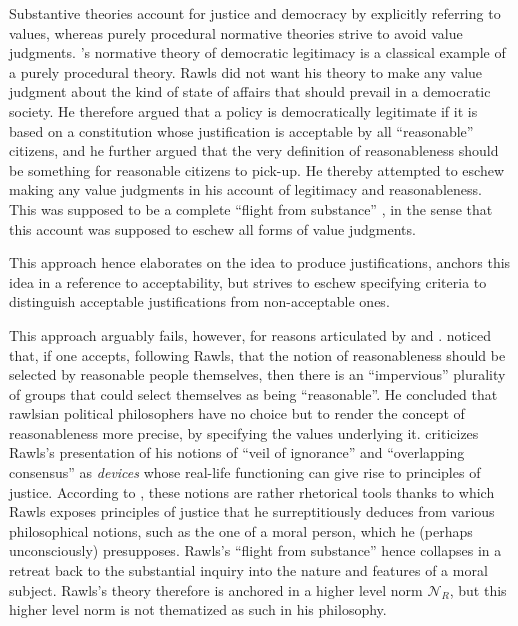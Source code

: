 \documentclass[preprint, french, english, 11pt, authoryear]{elsarticle}%
\begin{document}
Substantive theories account for justice and democracy by explicitly referring to values, whereas purely procedural normative theories strive to avoid value judgments. 
\cite{rawls_political_2005}’s normative theory of democratic legitimacy is a classical example of a purely procedural theory. 
Rawls did not want his theory to make any value judgment about the kind of state of affairs that should prevail in a democratic society. 
He therefore argued that a policy is democratically legitimate if it is based on a constitution whose justification is acceptable by all  “reasonable” citizens, and he further argued that the very definition of reasonableness should be something for reasonable citizens to pick-up. 
He thereby attempted to eschew making any value judgments in his account of legitimacy and reasonableness. 
This was supposed to be a complete ``flight from substance'' \citep{estlund_democratic_2009}, in the sense that this account was supposed to eschew all forms of value judgments.

This approach hence elaborates on the idea to produce justifications, anchors this idea in a reference to acceptability, but strives to eschew specifying criteria to distinguish acceptable justifications from non-acceptable ones.

This approach arguably fails, however, for reasons articulated by \citeauthor{habermas_reconciliation_1995} and \citeauthor{estlund_democratic_2009}. 
\citet{estlund_democratic_2009} noticed that, if one accepts, following Rawls, that the notion of reasonableness should be selected by reasonable people themselves, then there is an “impervious” plurality of groups that could select themselves as being “reasonable”. 
He concluded that rawlsian political philosophers have no choice but to render the concept of reasonableness more precise, by specifying the values underlying it. 
\cite{habermas_reconciliation_1995} criticizes Rawls's presentation of his notions of “veil of ignorance” and  “overlapping consensus” as \emph{devices} whose real-life functioning can give rise to principles of justice. 
According to \cite{habermas_reconciliation_1995}, these notions are rather rhetorical tools thanks to which Rawls exposes principles of justice that he surreptitiously deduces from various philosophical notions, such as the one of a moral person, which he (perhaps unconsciously) presupposes. 
Rawls's ``flight from substance'' hence collapses in a retreat back to the substantial inquiry into the nature and features of a moral subject.  Rawls's theory therefore is anchored in a higher level norm $\mathscr{N}_R$, but this higher level norm is not thematized as such in his philosophy.
\end{document}
